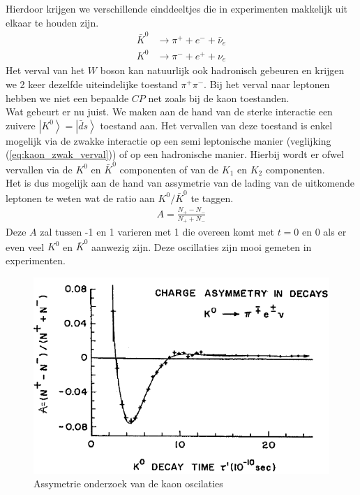 \documentclass[../main.tex]{subfiles}
\begin{document}
Hierdoor krijgen we verschillende einddeeltjes die in experimenten makkelijk uit elkaar te houden zijn.
\begin{equation}
    \begin{aligned}
        \label{eq:kaon_zwak_verval}
        \bar{K}^{0} &\rightarrow \pi^{+}+e^{-}+\bar{\nu}_{e} \\
        K^{0} &\rightarrow \pi^{-}+e^{+}+\nu_{e}
    \end{aligned}
\end{equation}
Het verval van het $W$ boson kan natuurlijk ook hadronisch gebeuren en krijgen we 2 keer dezelfde uiteindelijke toestand $\pi^+\pi^-$. Bij het verval naar leptonen hebben we niet een bepaalde $CP$ net zoals bij de kaon toestanden.\\
Wat gebeurt er nu juist. We maken aan de hand van de sterke interactie een zuivere $\left|K^0\right>=\left|\bar{d}s\right>$ toestand aan. Het vervallen van deze toestand is enkel mogelijk via de zwakke interactie op een semi leptonische manier (veglijking (\ref{eq:kaon_zwak_verval})) of op een hadronische manier. Hierbij wordt er ofwel vervallen via de $K^0$ en $\bar{K}^0$ componenten of van de $K_1$ en $K_2$ componenten.\\
Het is dus mogelijk aan de hand van assymetrie van de lading van de uitkomende leptonen te weten wat de ratio aan $K^0/\bar{K}^0$ te taggen.
\begin{equation}
    \begin{aligned}
        \label{eq:lepton_lading_assymetrie}
        A=\frac{N_{+}-N_{-}}{N_{+}+N_{-}}
    \end{aligned}
\end{equation}
Deze $A$ zal tussen -1 en 1 varieren met 1 die overeen komt met $t=0$ en 0 als er even veel $K^0$ en $\bar{K}^0$ aanwezig zijn. Deze oscillaties zijn mooi gemeten in experimenten.

\begin{figure}[h]
    \centering
    \includegraphics[width=0.5\linewidth]{meson_mixing_and_oscillations/kaon_osc_verval.png}
    \caption{Assymetrie onderzoek van de kaon oscilaties}%
    \label{fig:meson_mixing_and_oscillations/kaon_osc_verval}
\end{figure}
\end{document}
